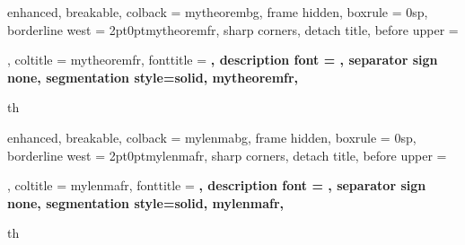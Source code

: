 
\makeatletter
{}
\makeatother


{%
	enhanced,
	breakable,
	colback = mytheorembg,
	frame hidden,
	boxrule = 0sp,
	borderline west = {2pt}{0pt}{mytheoremfr},
	sharp corners,
	detach title,
	before upper = \tcbtitle\par\smallskip,
	coltitle = mytheoremfr,
	fonttitle = \bfseries\sffamily,
	description font = \mdseries,
	separator sign none,
	segmentation style={solid, mytheoremfr},
}
{th}


{%
	enhanced,
	breakable,
	colback = mylenmabg,
	frame hidden,
	boxrule = 0sp,
	borderline west = {2pt}{0pt}{mylenmafr},
	sharp corners,
	detach title,
	before upper = \tcbtitle\par\smallskip,
	coltitle = mylenmafr,
	fonttitle = \bfseries\sffamily,
	description font = \mdseries,
	separator sign none,
	segmentation style={solid, mylenmafr},
}
{th}


\newcommand{\thm}[2]{\begin{Theorem*}{#1}{}#2\end{Theorem*}}
\newcommand{\qs}[2]{\begin{question*}{#1}{}#2\end{question*}}
\newcommand{\prp}[2]{\begin{Property*}{#1}{}#2\end{Property*}}
\newcommand{\lemma}[2]{\begin{Lemma*}{#1}{}#2\end{Lemma*}}
